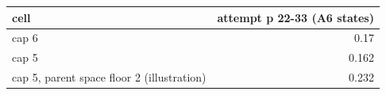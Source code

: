 \begin{tabular}{lr}
\toprule
cell & attempt p 22-33 (A6 states) \\
\midrule
cap 6 & 0.17 \\
cap 5 & 0.162 \\
cap 5, parent space floor 2 (illustration) & 0.232 \\
\bottomrule
\end{tabular}
